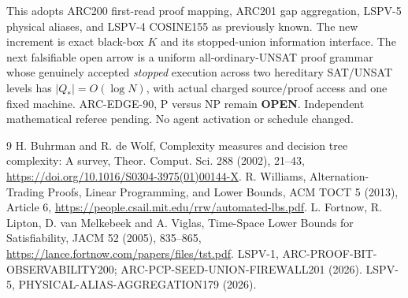 \documentclass[11pt]{article}
\begin{document}
This adopts ARC200 first-read proof mapping, ARC201 gap aggregation, LSPV-5 physical aliases, and LSPV-4 COSINE155 as previously known. The new increment is exact black-box $K$ and its stopped-union information interface. The next falsifiable open arrow is a uniform all-ordinary-UNSAT proof grammar whose genuinely accepted \emph{stopped} execution across two hereditary SAT/UNSAT levels has $|Q_*|=O(\log N)$, with actual charged source/proof access and one fixed machine. ARC-EDGE-90, P versus NP remain \textbf{OPEN}. Independent mathematical referee pending. No agent activation or schedule changed.

\begin{thebibliography}{9}
 H. Buhrman and R. de Wolf, Complexity measures and decision tree complexity: A survey, Theor. Comput. Sci. 288 (2002), 21--43, \url{https://doi.org/10.1016/S0304-3975(01)00144-X}.
 R. Williams, Alternation-Trading Proofs, Linear Programming, and Lower Bounds, ACM TOCT 5 (2013), Article 6, \url{https://people.csail.mit.edu/rrw/automated-lbs.pdf}.
 L. Fortnow, R. Lipton, D. van Melkebeek and A. Viglas, Time-Space Lower Bounds for Satisfiability, JACM 52 (2005), 835--865, \url{https://lance.fortnow.com/papers/files/tst.pdf}.
 LSPV-1, ARC-PROOF-BIT-OBSERVABILITY200; ARC-PCP-SEED-UNION-FIREWALL201 (2026).
 LSPV-5, PHYSICAL-ALIAS-AGGREGATION179 (2026).
\end{thebibliography}
\end{document}
